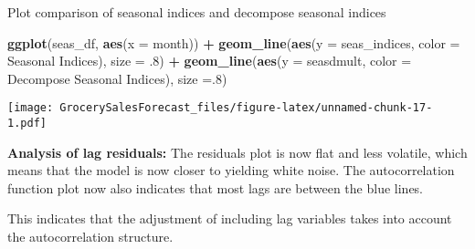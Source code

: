 \documentclass[
]{article}
\newenvironment{Shaded}{\begin{snugshade}}{\end{snugshade}}
\newcommand{\AttributeTok}[1]{\textcolor[rgb]{0.13,0.29,0.53}{#1}}
\newcommand{\DecValTok}[1]{\textcolor[rgb]{0.00,0.00,0.81}{#1}}
\newcommand{\FunctionTok}[1]{\textcolor[rgb]{0.13,0.29,0.53}{\textbf{#1}}}
\newcommand{\NormalTok}[1]{#1}
\newcommand{\SpecialCharTok}[1]{\textcolor[rgb]{0.81,0.36,0.00}{\textbf{#1}}}
\newcommand{\StringTok}[1]{\textcolor[rgb]{0.31,0.60,0.02}{#1}}
\begin{document}
Plot comparison of seasonal indices and decompose seasonal indices

\begin{Shaded}
\begin{Highlighting}[]
\FunctionTok{ggplot}\NormalTok{(seas\_df, }\FunctionTok{aes}\NormalTok{(}\AttributeTok{x =}\NormalTok{ month)) }\SpecialCharTok{+} 
  \FunctionTok{geom\_line}\NormalTok{(}\FunctionTok{aes}\NormalTok{(}\AttributeTok{y =}\NormalTok{ seas\_indices, }\AttributeTok{color =} \StringTok{\textquotesingle{}Seasonal Indices\textquotesingle{}}\NormalTok{), }\AttributeTok{size =}\NormalTok{ .}\DecValTok{8}\NormalTok{) }\SpecialCharTok{+} 
  \FunctionTok{geom\_line}\NormalTok{(}\FunctionTok{aes}\NormalTok{(}\AttributeTok{y =}\NormalTok{ seasdmult, }\AttributeTok{color =} \StringTok{\textquotesingle{}Decompose Seasonal Indices\textquotesingle{}}\NormalTok{), }\AttributeTok{size =}\NormalTok{.}\DecValTok{8}\NormalTok{)}
\end{Highlighting}
\end{Shaded}

\texttt{[image: GrocerySalesForecast\_files/figure-latex/unnamed-chunk-17-1.pdf]}

\textbf{Analysis of lag residuals:} The residuals plot is now flat and
less volatile, which means that the model is now closer to yielding
white noise. The autocorrelation function plot now also indicates that
most lags are between the blue lines.

This indicates that the adjustment of including lag variables takes into
account the autocorrelation structure.
\end{document}
